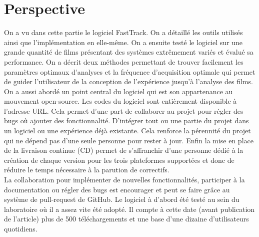 \chapter{Perspective}

	On a vu dans cette partie le logiciel FastTrack. On a détaillé les outils utilisés ainsi que l'implémentation en elle-même. On a ensuite testé le logiciel sur une grande quantité de films présentant des systèmes extrêmement variés et évalué sa performance. On a décrit deux méthodes permettant de trouver facilement les paramètres optimaux d'analyses et la fréquence d'acquisition optimale qui permet de guider l'utilisateur de la conception de l'expérience jusqu'à l'analyse des films.\\
	
	On a aussi abordé un point central du logiciel qui est son appartenance au mouvement open-source. Les codes du logiciel sont entièrement disponible à l'adresse URL. Cela permet d'une part de collaborer au projet pour régler des bugs où ajouter des fonctionnalité. D'intégrer tout ou une partie du projet dans un logiciel ou une expérience déjà existante. Cela renforce la pérennité du projet qui ne dépend pas d'une seule personne pour rester à jour. Enfin la mise en place de la livraison continue (CD) permet de s'affranchir d'une personne dédié à la création de chaque version pour les trois plateformes supportées et donc de réduire le temps nécessaire à la parution de correctifs.\\
	
	La collaboration pour implémenter de nouvelles fonctionnalités, participer à la documentation ou régler des bugs est encourager et peut se faire grâce au système de pull-request de GitHub. Le logiciel à d'abord été testé au sein du laboratoire où il a assez vite été adopté. Il compte à cette date (avant publication de l'article) plus de 500 téléchargements et une base d'une dizaine d'utilisateurs quotidiens.
	
	

